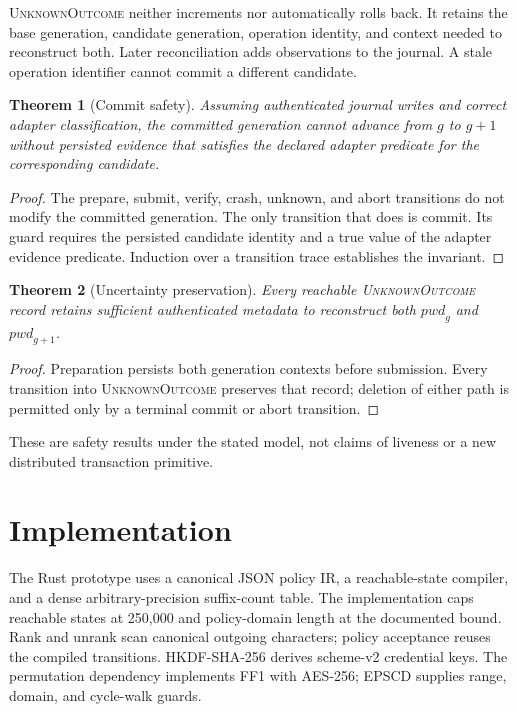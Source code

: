 \documentclass[preprint,12pt]{elsarticle}
\newtheorem{theorem}{Theorem}
\begin{document}
\textsc{UnknownOutcome} neither increments nor automatically rolls back. It
retains the base generation, candidate generation, operation identity, and
context needed to reconstruct both. Later reconciliation adds observations to
the journal. A stale operation identifier cannot commit a different candidate.

\begin{theorem}[Commit safety]
Assuming authenticated journal writes and correct adapter classification, the
committed generation cannot advance from $g$ to $g+1$ without persisted evidence
that satisfies the declared adapter predicate for the corresponding candidate.
\end{theorem}

\begin{proof}
The prepare, submit, verify, crash, unknown, and abort transitions do not modify
the committed generation. The only transition that does is commit. Its guard
requires the persisted candidate identity and a true value of the adapter
evidence predicate. Induction over a transition trace establishes the invariant.
\end{proof}

\begin{theorem}[Uncertainty preservation]
Every reachable \textnormal{\textsc{UnknownOutcome}} record retains sufficient authenticated
metadata to reconstruct both $\mathit{pwd}_g$ and $\mathit{pwd}_{g+1}$.
\end{theorem}

\begin{proof}
Preparation persists both generation contexts before submission. Every
transition into \textsc{UnknownOutcome} preserves that record; deletion of
either path is permitted only by a terminal commit or abort transition.
\end{proof}

These are safety results under the stated model, not claims of liveness or a new
distributed transaction primitive.

\section{Implementation}

The Rust prototype uses a canonical JSON policy IR, a reachable-state compiler,
and a dense arbitrary-precision suffix-count table. The implementation caps
reachable states at 250,000 and policy-domain length at the documented bound.
Rank and unrank scan canonical outgoing characters; policy acceptance reuses the
compiled transitions. HKDF-SHA-256 derives scheme-v2 credential keys. The
permutation dependency implements FF1 with AES-256; EPSCD supplies range,
domain, and cycle-walk guards.
\end{document}
